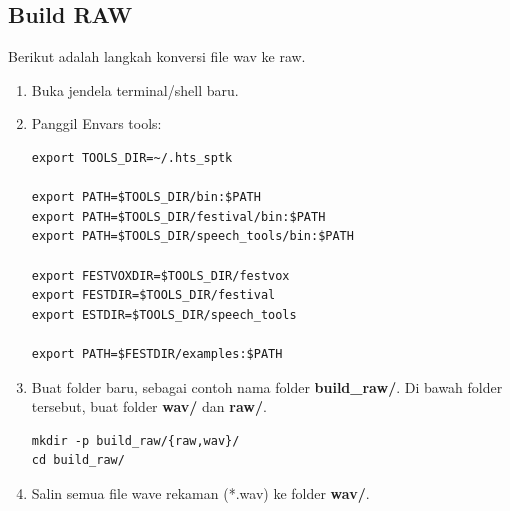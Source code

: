 \documentclass[12pt,]{article}
\begin{document}
	\newpage
	\subsection{Build RAW}

	Berikut adalah langkah konversi file wav ke raw.

	\begin{enumerate}
		\item Buka jendela terminal/shell baru.

		\item Panggil Envars tools:
		\begin{verbatim}
export TOOLS_DIR=~/.hts_sptk

export PATH=$TOOLS_DIR/bin:$PATH
export PATH=$TOOLS_DIR/festival/bin:$PATH
export PATH=$TOOLS_DIR/speech_tools/bin:$PATH

export FESTVOXDIR=$TOOLS_DIR/festvox
export FESTDIR=$TOOLS_DIR/festival
export ESTDIR=$TOOLS_DIR/speech_tools

export PATH=$FESTDIR/examples:$PATH
		\end{verbatim}

		\item Buat folder baru, sebagai contoh nama folder \textbf{build\_raw/}.
		Di bawah folder tersebut, buat folder \textbf{wav/} dan \textbf{raw/}.
		\begin{verbatim}
mkdir -p build_raw/{raw,wav}/
cd build_raw/
		\end{verbatim}

		\item Salin semua file wave rekaman (*.wav) ke folder \textbf{wav/}.

%
%
%
%


\end{enumerate}
\end{document}
